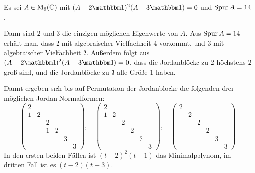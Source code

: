 \begin{example}
  Es sei $A \in \operatorname{M}_{6}(\mathbb{C})$ mit $(A - 2\Id)^2 (A - 3\Id) = 0$ und $\operatorname{Spur} A = 14$.
  
  Dann sind $2$ und $3$ die einzigen möglichen Eigenwerte von $A$.
  Aus $\operatorname{Spur} A = 14$ erhält man, dass $2$ mit algebraischer Vielfachheit $4$ vorkommt, und $3$ mit algebraischer Vielfachheit $2$.
  Außerdem folgt aus $(A - 2\Id)^2 (A - 3\Id) = 0$, dass die Jordanblöcke zu $2$ höchstens $2$ groß sind, und die Jordanblöcke zu $3$ alle Größe $1$ haben.
  
  Damit ergeben sich bis auf Permutation der Jordanblöcke die folgenden drei möglichen Jordan-Normalformen:
  \[
    \begin{pmatrix}
      2 &   &   &   &   &   \\
      1 & 2 &   &   &   &   \\
        &   & 2 &   &   &   \\
        &   & 1 & 2 &   &   \\
        &   &   &   & 3 &   \\
        &   &   &   &   & 3
    \end{pmatrix},
    \quad
    \begin{pmatrix}
      2 &   &   &   &   &   \\
      1 & 2 &   &   &   &   \\
        &   & 2 &   &   &   \\
        &   &   & 2 &   &   \\
        &   &   &   & 3 &   \\
        &   &   &   &   & 3
    \end{pmatrix},
    \quad
    \begin{pmatrix}
      2 &   &   &   &   &   \\
        & 2 &   &   &   &   \\
        &   & 2 &   &   &   \\
        &   &   & 2 &   &   \\
        &   &   &   & 3 &   \\
        &   &   &   &   & 3
    \end{pmatrix}
  \]
  In den ersten beiden Fällen ist $(t-2)^2 (t-1)$ das Minimalpolynom, im dritten Fall ist es $(t-2)(t-3)$.
\end{example}














